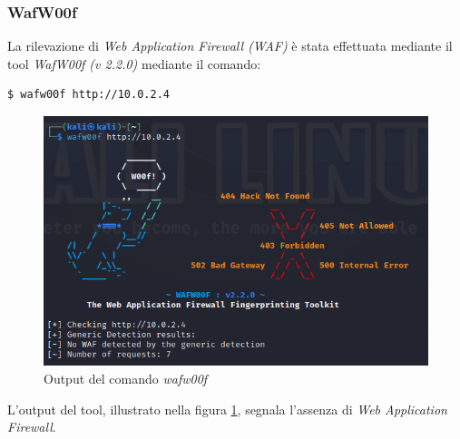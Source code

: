 \subsubsection{WafW00f}
La rilevazione di \emph{Web Application Firewall (WAF)} è stata effettuata mediante il tool \emph{WafW00f (v 2.2.0)} mediante il comando:
\begin{lstlisting}[language=bash]
    $ wafw00f http://10.0.2.4
\end{lstlisting}
\begin{figure}[h]
    \centering
    \includegraphics[scale=0.5]{capitoli/images/wafwoof.png}
    \caption{Output del comando \emph{wafw00f}}
    \label{fig:wafwoof}
\end{figure}
L'output del tool, illustrato nella figura \ref{fig:wafwoof}, segnala l'assenza di \emph{Web Application Firewall}.
